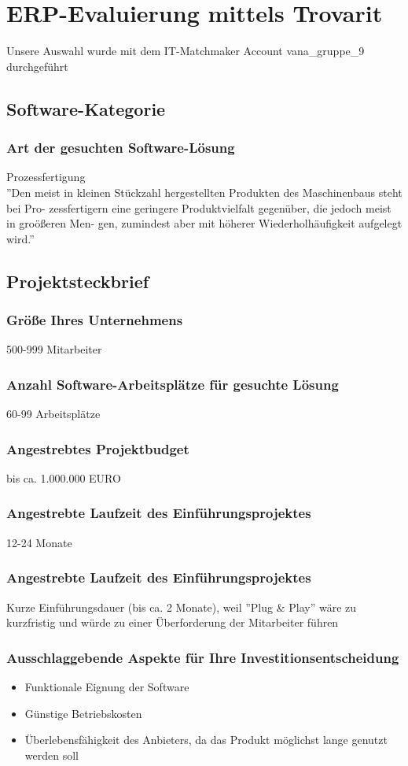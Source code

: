 \section{ERP-Evaluierung mittels Trovarit}
Unsere Auswahl wurde mit dem IT-Matchmaker Account vana\_gruppe\_9 durchgeführt


\subsection{Software-Kategorie}
\subsubsection{Art der gesuchten Software-Lösung}
Prozessfertigung\\
''Den meist in kleinen Stückzahl hergestellten Produkten des Maschinenbaus steht bei Pro- zessfertigern eine geringere Produktvielfalt gegenüber, die jedoch meist in groößeren Men- gen, zumindest aber mit höherer Wiederholhäufigkeit aufgelegt wird.'' \cite{trovarit_prozessfertigung}

\subsection{Projektsteckbrief}
\subsubsection{Größe Ihres Unternehmens}
500-999 Mitarbeiter
\subsubsection{Anzahl Software-Arbeitsplätze für gesuchte Lösung}
60-99 Arbeitsplätze
\subsubsection{Angestrebtes Projektbudget}
bis ca. 1.000.000 EURO
\subsubsection{Angestrebte Laufzeit des Einführungsprojektes}
12-24 Monate
\subsubsection{Angestrebte Laufzeit des Einführungsprojektes}
Kurze Einführungsdauer (bis ca. 2 Monate), weil ''Plug \& Play'' wäre zu kurzfristig und würde zu einer Überforderung der Mitarbeiter führen
\subsubsection{Ausschlaggebende Aspekte für Ihre Investitionsentscheidung}
\begin{itemize}
	\item Funktionale Eignung der Software
	\item Günstige Betriebskosten
	\item Überlebensfähigkeit des Anbieters, da das Produkt möglichst lange genutzt werden soll
\end{itemize}

